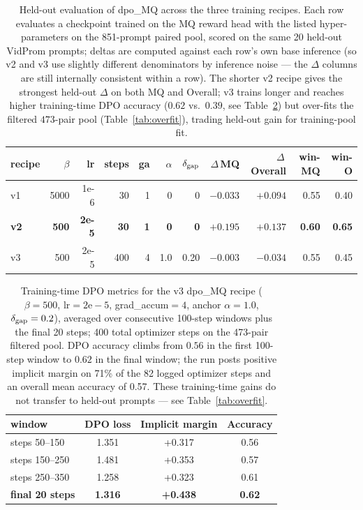 \documentclass{article}
\begin{document}
\begin{table}[t]
\centering
\caption{Held-out evaluation of dpo\_MQ across the three training recipes. Each row evaluates a checkpoint trained on the MQ reward head with the listed hyper-parameters on the 851-prompt paired pool, scored on the same 20 held-out VidProm prompts; deltas are computed against each row's own base inference (so v2 and v3 use slightly different denominators by inference noise --- the $\Delta$ columns are still internally consistent within a row). The shorter v2 recipe gives the strongest held-out $\Delta$ on both MQ and Overall; v3 trains longer and reaches higher training-time DPO accuracy ($0.62$ vs.\ $0.39$, see Table~\ref{tab:v3train}) but over-fits the filtered $473$-pair pool (Table~\ref{tab:overfit}), trading held-out gain for training-pool fit.}
\label{tab:recipe}
\begin{tabular}{lrrrrrrrrrr}
\toprule
recipe & $\beta$ & lr & steps & ga & $\alpha$ & $\delta_{\rm gap}$ & $\Delta$\,MQ & $\Delta$\,Overall & win-MQ & win-O \\
\midrule
v1 & 5000 & 1e-6 & 30 & 1 & 0 & 0 & $-0.033$ & $+0.094$ & 0.55 & 0.40 \\
\textbf{v2} & \textbf{500} & \textbf{2e-5} & \textbf{30} & \textbf{1} & \textbf{0} & \textbf{0} & \textbf{$+0.195$} & \textbf{$+0.137$} & \textbf{0.60} & \textbf{0.65} \\
v3 & 500 & 2e-5 & 400 & 4 & 1.0 & 0.20 & $-0.003$ & $-0.034$ & 0.55 & 0.45 \\
\bottomrule
\end{tabular}
\end{table}

\begin{table}[t]
\centering
\caption{Training-time DPO metrics for the v3 dpo\_MQ recipe ($\beta=500$, lr$=2\mathrm{e}{-}5$, grad\_accum$=4$, anchor $\alpha=1.0$, $\delta_{\rm gap}=0.2$), averaged over consecutive 100-step windows plus the final 20 steps; 400 total optimizer steps on the 473-pair filtered pool. DPO accuracy climbs from $0.56$ in the first 100-step window to $0.62$ in the final window; the run posts positive implicit margin on 71\% of the 82 logged optimizer steps and an overall mean accuracy of 0.57. These training-time gains do not transfer to held-out prompts --- see Table~\ref{tab:overfit}.}
\label{tab:v3train}
\begin{tabular}{lccc}
\toprule
window & DPO loss & Implicit margin & Accuracy \\
\midrule
steps 50--150 & 1.351 & +0.317 & 0.56 \\
steps 150--250 & 1.481 & +0.353 & 0.57 \\
steps 250--350 & 1.258 & +0.323 & 0.61 \\
\textbf{final 20 steps} & \textbf{1.316} & \textbf{+0.438} & \textbf{0.62} \\
\bottomrule
\end{tabular}
\end{table}
\end{document}
